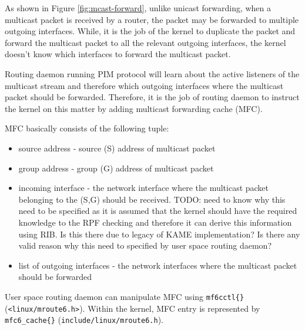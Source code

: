 \documentclass{article}
\begin{document}
As shown in Figure \ref{fig:mcast-forward}, unlike unicast forwarding, when a
multicast packet is received by a router, the packet may be forwarded to
multiple outgoing interfaces. While, it is the job of the kernel to duplicate
the packet and forward the multicast packet to all the relevant outgoing
interfaces, the kernel doesn't know which interfaces to forward the multicast
packet. 

Routing daemon running PIM protocol will learn about the active listeners of the
multicast stream and therefore which outgoing interfaces where the multicast
packet should be forwarded. Therefore, it is the job of routing daemon to
instruct the kernel on this matter by adding multicast forwarding cache (MFC).

MFC basically consists of the following tuple:
\begin{itemize}
  \item source address - source (S) address of multicast packet
  \item group address - group (G) address of multicast packet
  \item incoming interface - the network interface where the multicast packet
  belonging to the (S,G) should be received. TODO: need to know why this need to
  be specified as it is assumed that the kernel should have the required
  knowledge to the RPF checking and therefore it can derive this information
  using RIB. Is this there due to legacy of KAME implementation? Is there any
  valid reason why this need to specified by user space routing daemon?
  \item list of outgoing interfaces - the network interfaces where the multicast
  packet should be forwarded 
\end{itemize}

User space routing daemon can manipulate MFC using \texttt{mf6cctl\{\}}
(\texttt{<linux/mroute6.h>}). Within the kernel, MFC entry is represented by
\texttt{mfc6\_cache\{\}} (\texttt{include/linux/mroute6.h}).
\end{document}
